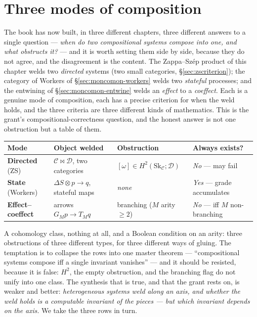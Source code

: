 \documentclass[11pt,a4paper]{book}
\theoremstyle{plain}
\theoremstyle{definition}
\theoremstyle{remark}
\begin{document}
\section{Three modes of composition}
\label{sec:threemodes}

The book has now built, in three different chapters, three different answers to a
single question --- \emph{when do two compositional systems compose into one, and
what obstructs it?} --- and it is worth setting them side by side, because they do
not agree, and the disagreement is the content. The Zappa--Sz\'ep product of this
chapter welds two \emph{directed} systems (two small categories,
\S\ref{sec:zscriterion}); the category of Workers of \S\ref{sec:moncomon-workers}
welds two \emph{stateful} processes; and the entwining of
\S\ref{sec:moncomon-entwine} welds an \emph{effect} to a \emph{coeffect}. Each is a
genuine mode of composition, each has a precise criterion for when the weld holds,
and the three criteria are three different kinds of mathematics. This is the
grant's compositional-correctness question, and the honest answer is not one
obstruction but a table of them.

\begin{center}
\renewcommand{\arraystretch}{1.35}
\begin{tabular}{@{}llll@{}}
\toprule
Mode & Object welded & Obstruction & Always exists?\\
\midrule
\textbf{Directed} (ZS) & $\mathcal C\bowtie\mathcal D$, two categories
  & $[\omega]\in H^{2}(\mathrm{Sk}_{\mathcal C};\mathcal D)$ & \emph{No} --- may fail\\
\textbf{State} (Workers) & $\Delta S\otimes p\to q$, stateful maps
  & \emph{none} & \emph{Yes} --- grade accumulates\\
\textbf{Effect--coeffect} & arrows $G_{M}p\to T_{M}q$
  & branching ($M$ arity $\ge 2$) & \emph{No} --- iff $M$ non-branching\\
\bottomrule
\end{tabular}
\end{center}

A cohomology class, nothing at all, and a Boolean condition on an arity: three
obstructions of three different types, for three different ways of gluing. The
temptation is to collapse the rows into one master theorem --- ``compositional
systems compose iff a single invariant vanishes'' --- and it should be resisted,
because it is false: $H^{2}$, the empty obstruction, and the branching flag do not
unify into one class. The synthesis that is true, and that the grant rests on, is
weaker and better: \emph{heterogeneous systems weld along an axis, and whether the
weld holds is a computable invariant of the pieces --- but which invariant depends
on the axis.} We take the three rows in turn.
\end{document}
